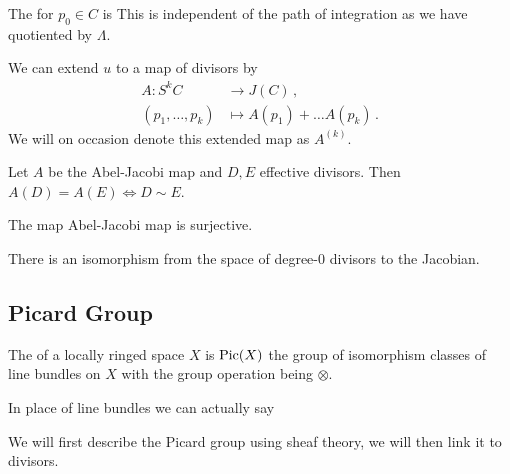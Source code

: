 \documentclass{article}
\begin{document}
\begin{definition}
	The  for $p_0 \in C$ is 
	This is independent of the path of integration as we have quotiented by $\Lambda$. 
\end{definition}

\begin{remark}
	We can extend $u$ to a map of divisors by 
	\begin{align*}
	A : S^k C &\to J(C) \, ,\\
	(p_1, \dots, p_k) &\mapsto A(p_1) + \dots A(p_k) \, .
	\end{align*}
	We will on occasion denote this extended map as $A^{(k)}$. 
\end{remark}

\begin{theorem}
	Let $A$ be the Abel-Jacobi map and $D,E$ effective divisors. Then $A(D) = A(E) \Leftrightarrow D \sim E$. 
\end{theorem}

\begin{theorem}
	The map Abel-Jacobi map is surjective. 
\end{theorem}

\begin{corollary}
	There is an isomorphism from the space of degree-0 divisors to the Jacobian. 
\end{corollary}

\subsection{Picard Group}\label{subsec:Picard Group}

\begin{definition}
	The  of a locally ringed space $X$ is $\operatorname{Pic}(X)$ the group of isomorphism classes of line bundles on $X$ with the group operation being $\otimes$. 
\end{definition}

\begin{remark}
	In place of line bundles we can actually say  
\end{remark}

We will first describe the Picard group using sheaf theory, we will then link it to divisors. 
\end{document}
